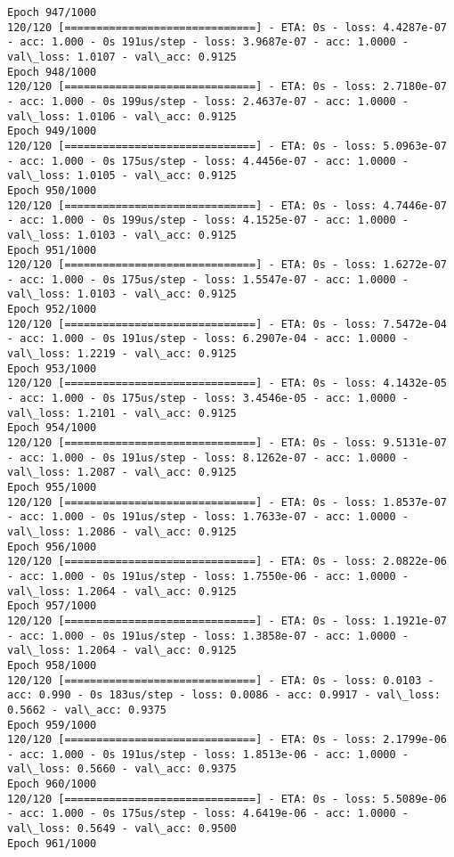 \documentclass[11pt]{article}
\begin{document}
\begin{Verbatim}[commandchars=\\\{\}]
Epoch 947/1000
120/120 [==============================] - ETA: 0s - loss: 4.4287e-07 - acc: 1.000 - 0s 191us/step - loss: 3.9687e-07 - acc: 1.0000 - val\_loss: 1.0107 - val\_acc: 0.9125
Epoch 948/1000
120/120 [==============================] - ETA: 0s - loss: 2.7180e-07 - acc: 1.000 - 0s 199us/step - loss: 2.4637e-07 - acc: 1.0000 - val\_loss: 1.0106 - val\_acc: 0.9125
Epoch 949/1000
120/120 [==============================] - ETA: 0s - loss: 5.0963e-07 - acc: 1.000 - 0s 175us/step - loss: 4.4456e-07 - acc: 1.0000 - val\_loss: 1.0105 - val\_acc: 0.9125
Epoch 950/1000
120/120 [==============================] - ETA: 0s - loss: 4.7446e-07 - acc: 1.000 - 0s 199us/step - loss: 4.1525e-07 - acc: 1.0000 - val\_loss: 1.0103 - val\_acc: 0.9125
Epoch 951/1000
120/120 [==============================] - ETA: 0s - loss: 1.6272e-07 - acc: 1.000 - 0s 175us/step - loss: 1.5547e-07 - acc: 1.0000 - val\_loss: 1.0103 - val\_acc: 0.9125
Epoch 952/1000
120/120 [==============================] - ETA: 0s - loss: 7.5472e-04 - acc: 1.000 - 0s 191us/step - loss: 6.2907e-04 - acc: 1.0000 - val\_loss: 1.2219 - val\_acc: 0.9125
Epoch 953/1000
120/120 [==============================] - ETA: 0s - loss: 4.1432e-05 - acc: 1.000 - 0s 175us/step - loss: 3.4546e-05 - acc: 1.0000 - val\_loss: 1.2101 - val\_acc: 0.9125
Epoch 954/1000
120/120 [==============================] - ETA: 0s - loss: 9.5131e-07 - acc: 1.000 - 0s 191us/step - loss: 8.1262e-07 - acc: 1.0000 - val\_loss: 1.2087 - val\_acc: 0.9125
Epoch 955/1000
120/120 [==============================] - ETA: 0s - loss: 1.8537e-07 - acc: 1.000 - 0s 191us/step - loss: 1.7633e-07 - acc: 1.0000 - val\_loss: 1.2086 - val\_acc: 0.9125
Epoch 956/1000
120/120 [==============================] - ETA: 0s - loss: 2.0822e-06 - acc: 1.000 - 0s 191us/step - loss: 1.7550e-06 - acc: 1.0000 - val\_loss: 1.2064 - val\_acc: 0.9125
Epoch 957/1000
120/120 [==============================] - ETA: 0s - loss: 1.1921e-07 - acc: 1.000 - 0s 191us/step - loss: 1.3858e-07 - acc: 1.0000 - val\_loss: 1.2064 - val\_acc: 0.9125
Epoch 958/1000
120/120 [==============================] - ETA: 0s - loss: 0.0103 - acc: 0.990 - 0s 183us/step - loss: 0.0086 - acc: 0.9917 - val\_loss: 0.5662 - val\_acc: 0.9375
Epoch 959/1000
120/120 [==============================] - ETA: 0s - loss: 2.1799e-06 - acc: 1.000 - 0s 191us/step - loss: 1.8513e-06 - acc: 1.0000 - val\_loss: 0.5660 - val\_acc: 0.9375
Epoch 960/1000
120/120 [==============================] - ETA: 0s - loss: 5.5089e-06 - acc: 1.000 - 0s 175us/step - loss: 4.6419e-06 - acc: 1.0000 - val\_loss: 0.5649 - val\_acc: 0.9500
Epoch 961/1000

\end{Verbatim}
\end{document}
